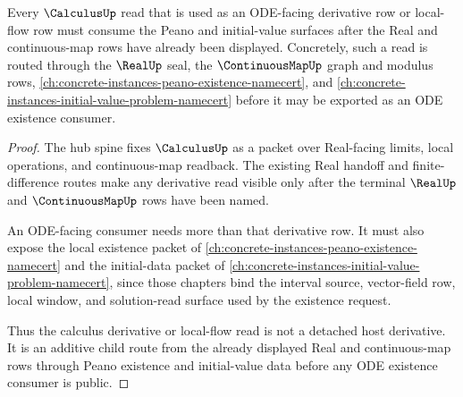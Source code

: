 \begin{theorem}\label{thm:calculus-peano-dependency-route}
Every $\CalculusUp$ read that is used as an ODE-facing derivative row or local-flow row must consume the Peano and initial-value surfaces after the Real and continuous-map rows have already been displayed. Concretely, such a read is routed through the $\RealUp$ seal, the $\ContinuousMapUp$ graph and modulus rows, \autoref{ch:concrete-instances-peano-existence-namecert}, and \autoref{ch:concrete-instances-initial-value-problem-namecert} before it may be exported as an ODE existence consumer.
\end{theorem}
\begin{proof}
The hub spine fixes $\CalculusUp$ as a packet over Real-facing limits, local operations, and continuous-map readback. The existing Real handoff and finite-difference routes make any derivative read visible only after the terminal $\RealUp$ and $\ContinuousMapUp$ rows have been named.

An ODE-facing consumer needs more than that derivative row. It must also expose the local existence packet of \autoref{ch:concrete-instances-peano-existence-namecert} and the initial-data packet of \autoref{ch:concrete-instances-initial-value-problem-namecert}, since those chapters bind the interval source, vector-field row, local window, and solution-read surface used by the existence request.

Thus the calculus derivative or local-flow read is not a detached host derivative. It is an additive child route from the already displayed Real and continuous-map rows through Peano existence and initial-value data before any ODE existence consumer is public.
\end{proof}
